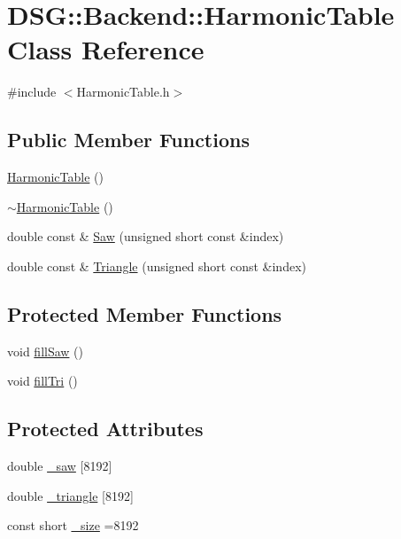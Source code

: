 \hypertarget{classDSG_1_1Backend_1_1HarmonicTable}{\section{D\+S\+G\+:\+:Backend\+:\+:Harmonic\+Table Class Reference}
\label{classDSG_1_1Backend_1_1HarmonicTable}
}


{\ttfamily \#include $<$Harmonic\+Table.\+h$>$}

\subsection*{Public Member Functions}
\begin{DoxyCompactItemize}
\item 
\hyperlink{classDSG_1_1Backend_1_1HarmonicTable_a35027a283a7438282bfa7466fc9308e3}{Harmonic\+Table} ()
\item 
\hyperlink{classDSG_1_1Backend_1_1HarmonicTable_aaec7bccf6751a172029be53e77f0dc7e}{$\sim$\+Harmonic\+Table} ()
\item 
double const \& \hyperlink{classDSG_1_1Backend_1_1HarmonicTable_a705b954562e472506ac0c2c7d7ccb5b9}{Saw} (unsigned short const \&index)
\item 
double const \& \hyperlink{classDSG_1_1Backend_1_1HarmonicTable_a665e08fd1bd65ded1f5493cb7de5e330}{Triangle} (unsigned short const \&index)
\end{DoxyCompactItemize}
\subsection*{Protected Member Functions}
\begin{DoxyCompactItemize}
\item 
void \hyperlink{classDSG_1_1Backend_1_1HarmonicTable_a9c5b2c4c115e43d4269aa2f89231efb5}{fill\+Saw} ()
\item 
void \hyperlink{classDSG_1_1Backend_1_1HarmonicTable_ad72f5443d88ccc64e7ab8782a1d80455}{fill\+Tri} ()
\end{DoxyCompactItemize}
\subsection*{Protected Attributes}
\begin{DoxyCompactItemize}
\item 
double \hyperlink{classDSG_1_1Backend_1_1HarmonicTable_ad5d0c429c75e41c83c098fcab28cfb8c}{\+\_\+saw} \mbox{[}8192\mbox{]}
\item 
double \hyperlink{classDSG_1_1Backend_1_1HarmonicTable_a70d00f8d0ad9a244ebf4a8784a69ec33}{\+\_\+triangle} \mbox{[}8192\mbox{]}
\item 
const short \hyperlink{classDSG_1_1Backend_1_1HarmonicTable_a478d8f277438567c219780d3bd372566}{\+\_\+size} =8192
\end{DoxyCompactItemize}


